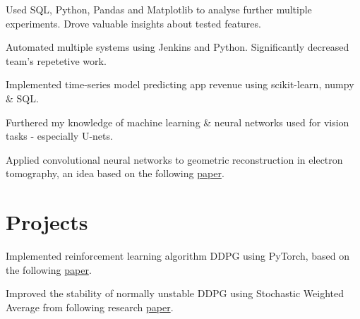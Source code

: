 \documentclass[]{CV}
\begin{document}
\begin{minipage}[t]{0.70\textwidth}
\begin{tightemize}
\item Used SQL, Python, Pandas and Matplotlib to analyse further multiple experiments. Drove valuable insights about tested features.

\item Automated multiple systems using Jenkins and Python. Significantly decreased team's repetetive work.

\item Implemented time-series model predicting app revenue using scikit-learn, numpy \& SQL.

\end{tightemize}
\sectionsep

\vspace{\topsep} %
\begin{tightemize}
\sectionsep
\item Furthered my knowledge of machine learning \& neural networks used for vision tasks - especially U-nets.

\item  Applied convolutional neural networks to geometric reconstruction in electron tomography, an idea based on the following {\href{https://core.ac.uk/download/pdf/204935374.pdf}{paper}}.

\end{tightemize}
\sectionsep



\section{Projects}

\begin{tightemize}

\item Implemented reinforcement learning algorithm DDPG using PyTorch, based on the following {\href{https://arxiv.org/abs/1509.0297[]}{paper}}.

\item Improved the stability of normally unstable DDPG using Stochastic Weighted Average from following research {\href{https://arxiv.org/abs/1803.05407}{paper}}.


\end{tightemize}
\end{minipage}
\end{document}
